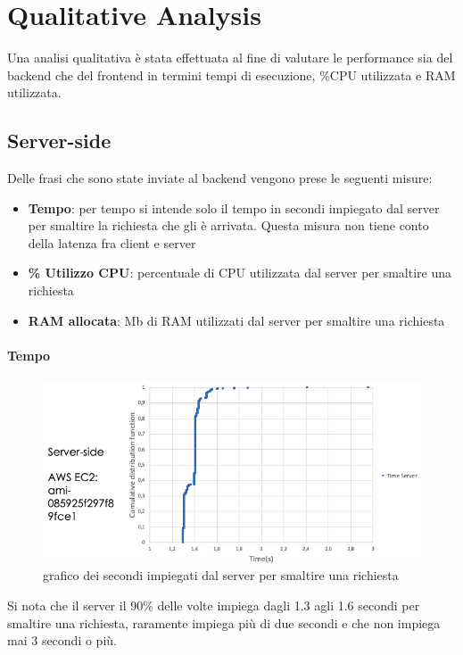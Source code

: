 \section{Qualitative Analysis}
\label{sec:quantitative}
Una analisi qualitativa è stata effettuata al fine di valutare le performance sia del backend che del frontend in termini tempi di esecuzione, \%CPU utilizzata e RAM utilizzata.
\subsection{Server-side}
\label{sec:quantbackend}
Delle frasi che sono state inviate al backend vengono prese le seguenti misure:
\begin{itemize}
    \item \textbf{Tempo}: per tempo si intende solo il tempo in secondi impiegato dal server per smaltire la richiesta che gli è arrivata. Questa misura non tiene conto della latenza fra client e server
    \item \textbf{\% Utilizzo CPU}: percentuale di CPU utilizzata dal server per smaltire una richiesta 
    \item \textbf{RAM allocata}: Mb di RAM utilizzati dal server per smaltire una richiesta
\end{itemize}

\paragraph{Tempo}

\begin{figure}[h!t]
    \centering
    \includegraphics[width=15cm]{Figure/quantitativa/timeSrv.png}
    \caption{grafico dei secondi impiegati dal server per smaltire una richiesta}
    \label{fig:srvTime}
\end{figure}
\FloatBarrier

Si nota che il server il 90\% delle volte impiega dagli 1.3 agli 1.6 secondi per smaltire una richiesta, raramente impiega più di due secondi e che non impiega mai 3 secondi o più.

